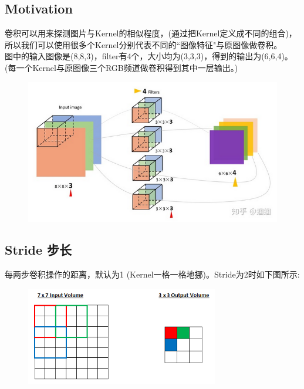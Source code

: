 \documentclass[11pt]{article}
\begin{document}
\subsection{Motivation}
卷积可以用来探测图片与Kernel的相似程度，(通过把Kernel定义成不同的组合)，所以我们可以使用很多个Kernel分别代表不同的``图像特征"与原图像做卷积。\\

图中的输入图像是(8,8,3)，filter有4个，大小均为(3,3,3)，得到的输出为(6,6,4)。(每一个Kernel与原图像三个RGB频道做卷积得到其中一层输出。)

\begin{figure}[hbt!]
  \includegraphics[width=\textwidth]{assets/cnn2.png}
  \centering
\end{figure}



\subsection{Stride 步长}
每两步卷积操作的距离，默认为1 (Kernel一格一格地挪)。Stride为2时如下图所示:

\begin{figure}[hbt!]
  \centering
  \includegraphics[width=0.75\textwidth]{assets/stride.png}
\end{figure}
\end{document}
